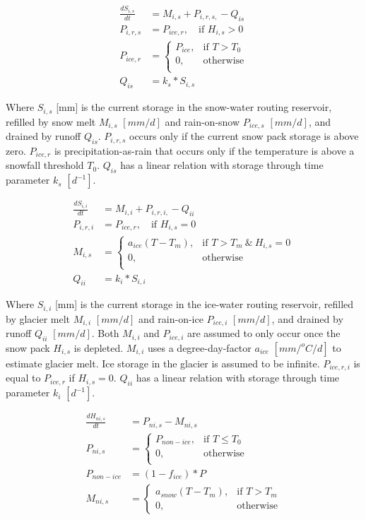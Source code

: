 \begin{align}
	\frac{dS_{i,s}}{dt} &= M_{i,s} +P_{i,r,s,} -Q_{is}\\
	P_{i,r,s} &= P_{ice,r}, \quad \text{if } H_{i,s} > 0 \\
	P_{ice,r} &= \begin{cases}
		P_{ice}, &\text{if } T > T_0 \\
		0, & \text{otherwise} \\
	\end{cases} \\
	Q_{is} &= k_s*S_{i,s}
\end{align}
  
Where $S_{i,s}$ [mm] is the current storage in the snow-water routing reservoir, refilled by snow melt $M_{i,s}$ $[mm/d]$ and rain-on-snow $P_{ice,s}$ $[mm/d]$, and drained by runoff $Q_{is}$.
$P_{i,r,s}$ occurs only if the current snow pack storage is above zero.
$P_{ice,r}$ is precipitation-as-rain that occurs only if the temperature is above a snowfall threshold $T_0$.
$Q_{is}$ has a linear relation with storage through time parameter $k_s$ $[d^{-1}]$.

\begin{align}
	\frac{dS_{i,i}}{dt} &= M_{i,i} +P_{i,r,i,} -Q_{ii}\\
	P_{i,r,i} &= P_{ice,r}, \quad \text{if } H_{i,s} = 0 \\
	M_{i,s} &= \begin{cases}
		a_{ice}(T-T_m), &\text{if } T > T_m ~\&~ H_{i,s} = 0 \\
		0, &\text{otherwise} \\
	\end{cases}  \\
	Q_{ii} &= k_i*S_{i,i}
\end{align}

Where $S_{i,i}$ [mm] is the current storage in the ice-water routing reservoir, refilled by glacier melt $M_{i,i}$ $[mm/d]$ and rain-on-ice $P_{ice,i}$ $[mm/d]$, and drained by runoff $Q_{ii}$ $[mm/d]$.
Both $M_{i,i}$ and $P_{ice,i}$ are assumed to only occur once the snow pack $H_{i,s}$ is depleted.
$M_{i,i}$ uses a degree-day-factor $a_{ice}$ $[mm/^oC/d]$ to estimate glacier melt. 
Ice storage in the glacier is assumed to be infinite.
$P_{ice,r,i}$ is equal to $P_{ice,r}$ if $H_{i,s} = 0$.
$Q_{ii}$ has a linear relation with storage through time parameter $k_i$ $[d^{-1}]$.

\begin{align}
	\frac{dH_{ni,s}}{dt} &= P_{ni,s} - M_{ni,s}\\
	P_{ni,s} &= \begin{cases}
		P_{non-ice}, &\text{if } T \leq T_0 \\
		0, & \text{otherwise} \\
	\end{cases} \\
	P_{non-ice} &= (1-f_{ice})*P \\
	M_{ni,s} &= \begin{cases}
		a_{snow}(T-T_m), &\text{if } T > T_m \\
		0, &\text{otherwise} 
	\end{cases} 
\end{align}

